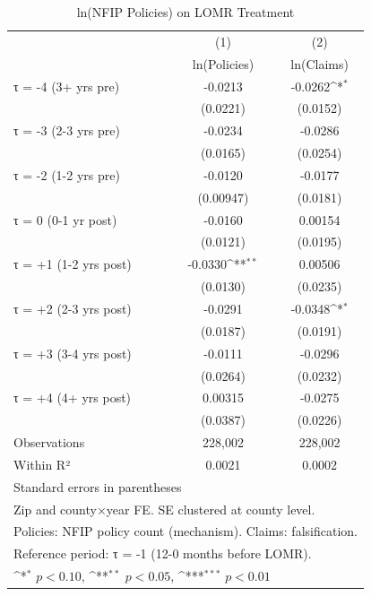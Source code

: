 \begin{table}[htbp]\centering
\def\sym#1{\ifmmode^{#1}\else\(^{#1}\)\fi}
\caption{ln(NFIP Policies) on LOMR Treatment}
\label{tab:insurance}
\begin{tabular}{l*{2}{c}}
\hline\hline
                    &\multicolumn{1}{c}{(1)}&\multicolumn{1}{c}{(2)}\\
                    &\multicolumn{1}{c}{ln(Policies)}&\multicolumn{1}{c}{ln(Claims)}\\
\hline
τ = -4 (3+ yrs pre) &     -0.0213         &     -0.0262\sym{*}  \\
                    &    (0.0221)         &    (0.0152)         \\
[0.3em]
τ = -3 (2-3 yrs pre)&     -0.0234         &     -0.0286         \\
                    &    (0.0165)         &    (0.0254)         \\
[0.3em]
τ = -2 (1-2 yrs pre)&     -0.0120         &     -0.0177         \\
                    &   (0.00947)         &    (0.0181)         \\
[0.3em]
τ = 0 (0-1 yr post) &     -0.0160         &     0.00154         \\
                    &    (0.0121)         &    (0.0195)         \\
[0.3em]
τ = +1 (1-2 yrs post)&     -0.0330\sym{**} &     0.00506         \\
                    &    (0.0130)         &    (0.0235)         \\
[0.3em]
τ = +2 (2-3 yrs post)&     -0.0291         &     -0.0348\sym{*}  \\
                    &    (0.0187)         &    (0.0191)         \\
[0.3em]
τ = +3 (3-4 yrs post)&     -0.0111         &     -0.0296         \\
                    &    (0.0264)         &    (0.0232)         \\
[0.3em]
τ = +4 (4+ yrs post)&     0.00315         &     -0.0275         \\
                    &    (0.0387)         &    (0.0226)         \\
\hline
Observations        &     228,002         &     228,002         \\
Within R²           &      0.0021         &      0.0002         \\
\hline\hline
\multicolumn{3}{l}{\footnotesize Standard errors in parentheses}\\
\multicolumn{3}{l}{\footnotesize Zip and county×year FE. SE clustered at county level.}\\
\multicolumn{3}{l}{\footnotesize Policies: NFIP policy count (mechanism). Claims: falsification.}\\
\multicolumn{3}{l}{\footnotesize Reference period: τ = -1 (12-0 months before LOMR).}\\
\multicolumn{3}{l}{\footnotesize \sym{*} \(p<0.10\), \sym{**} \(p<0.05\), \sym{***} \(p<0.01\)}\\
\end{tabular}
\end{table}
